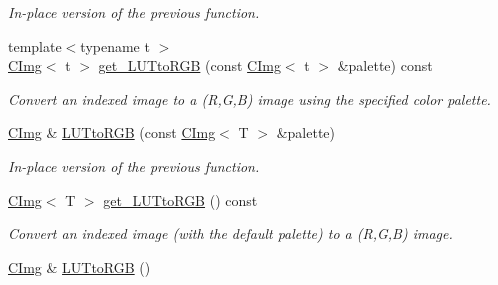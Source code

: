 \begin{DoxyCompactItemize}
\begin{DoxyCompactList}\small\item\em In-\/place version of the previous function. \end{DoxyCompactList}\item 
\hypertarget{structcimg__library_1_1_c_img_aee18d3c55b117b42d507bac215e0793a}{{\footnotesize template$<$typename t $>$ }\\\hyperlink{structcimg__library_1_1_c_img}{C\-Img}$<$ t $>$ \hyperlink{structcimg__library_1_1_c_img_aee18d3c55b117b42d507bac215e0793a}{get\-\_\-\-L\-U\-Tto\-R\-G\-B} (const \hyperlink{structcimg__library_1_1_c_img}{C\-Img}$<$ t $>$ \&palette) const }\label{structcimg__library_1_1_c_img_aee18d3c55b117b42d507bac215e0793a}

\begin{DoxyCompactList}\small\item\em Convert an indexed image to a (R,G,B) image using the specified color palette. \end{DoxyCompactList}\item 
\hypertarget{structcimg__library_1_1_c_img_a6440d33314f665c5fc5f63fba3a55998}{\hyperlink{structcimg__library_1_1_c_img}{C\-Img} \& \hyperlink{structcimg__library_1_1_c_img_a6440d33314f665c5fc5f63fba3a55998}{L\-U\-Tto\-R\-G\-B} (const \hyperlink{structcimg__library_1_1_c_img}{C\-Img}$<$ T $>$ \&palette)}\label{structcimg__library_1_1_c_img_a6440d33314f665c5fc5f63fba3a55998}

\begin{DoxyCompactList}\small\item\em In-\/place version of the previous function. \end{DoxyCompactList}\item 
\hypertarget{structcimg__library_1_1_c_img_a8269a939d41fce5fcd1b775c409faa3d}{\hyperlink{structcimg__library_1_1_c_img}{C\-Img}$<$ T $>$ \hyperlink{structcimg__library_1_1_c_img_a8269a939d41fce5fcd1b775c409faa3d}{get\-\_\-\-L\-U\-Tto\-R\-G\-B} () const }\label{structcimg__library_1_1_c_img_a8269a939d41fce5fcd1b775c409faa3d}

\begin{DoxyCompactList}\small\item\em Convert an indexed image (with the default palette) to a (R,G,B) image. \end{DoxyCompactList}\item 
\hypertarget{structcimg__library_1_1_c_img_a459316c96d223fa6c12578bd1ca63da4}{\hyperlink{structcimg__library_1_1_c_img}{C\-Img} \& \hyperlink{structcimg__library_1_1_c_img_a459316c96d223fa6c12578bd1ca63da4}{L\-U\-Tto\-R\-G\-B} ()}\label{structcimg__library_1_1_c_img_a459316c96d223fa6c12578bd1ca63da4}


\end{DoxyCompactItemize}
